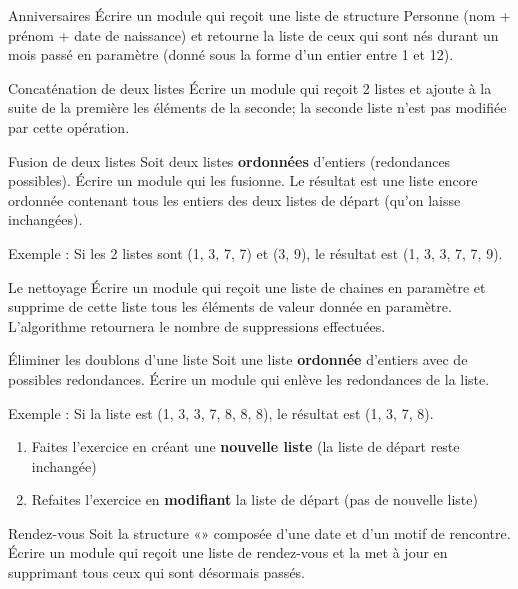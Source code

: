 		\begin{Exercice}{Anniversaires}
				Écrire un module qui reçoit une liste de structure Personne 
				(nom + prénom + date de naissance) et retourne la liste
				de ceux qui sont nés durant un mois passé en paramètre 
				(donné sous la forme d'un entier entre 1 et 12).
		\end{Exercice}
			
		\begin{Exercice}{Concaténation de deux listes}
				Écrire un module qui reçoit 2 listes et ajoute
				à la suite de la première les éléments de la seconde; la seconde liste
				n'est pas modifiée par cette opération.
		\end{Exercice}
		
		\begin{Exercice}{Fusion de deux listes}
				Soit deux listes \textbf{ordonnées}
				d'entiers (redondances possibles). Écrire un module
				qui les fusionne. Le résultat est une liste encore ordonnée contenant
				tous les entiers des deux listes de départ (qu'on
				laisse inchangées).
		
				Exemple : Si les 2 listes sont (1, 3, 7, 7) et (3, 9), 
				le résultat est (1, 3, 3, 7, 7, 9).
		\end{Exercice}
		
		\begin{Exercice}{Le nettoyage}
			Écrire un module qui reçoit une liste de chaines en paramètre et
			supprime de cette liste tous les éléments de valeur donnée en
			paramètre. L'algorithme retournera le nombre de
			suppressions effectuées.
		\end{Exercice}
			
		\begin{Exercice}{Éliminer les doublons d'une liste}
				Soit une liste \textbf{ordonnée} 
				d'entiers avec de possibles redondances. Écrire un
				module qui enlève les redondances de la liste.
						
				Exemple : Si la liste est (1, 3, 3, 7, 8, 8, 8),
				le résultat est (1, 3, 7, 8).
		
				\begin{enumerate}[label=\alph*)]
					\item 
						Faites l'exercice en créant une \textbf{nouvelle
						liste} (la liste de départ reste inchangée)
					\item 
						Refaites l'exercice en \textbf{modifiant}
						la liste de départ (pas de nouvelle liste)
				\end{enumerate}
		\end{Exercice}
				
		\begin{Exercice}{Rendez-vous}
			Soit la structure «» composée d’une date
			et d’un motif de rencontre. Écrire un module qui reçoit une liste de
			rendez-vous et la met à jour en supprimant tous ceux qui sont désormais
			passés. 
		\end{Exercice}
		
	
